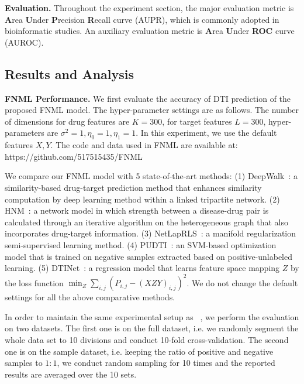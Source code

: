 \documentclass[conference]{IEEEtran}
\begin{document}

\textbf{Evaluation.} Throughout the experiment section, the major evaluation metric is \textbf{A}rea \textbf{U}nder \textbf{P}recision \textbf{R}ecall curve (AUPR), which is commonly adopted in bioinformatic studies. An auxiliary evaluation metric is \textbf{A}rea \textbf{U}nder \textbf{ROC} curve (AUROC).

\subsection{Results and Analysis}
\textbf{FNML Performance.} We first evaluate the accuracy of DTI prediction of the proposed FNML model. The hyper-parameter settings are as follows. The number of dimensions for drug features are $K=300$, for target features $L=300$, hyper-parameters are $\sigma^2=1,\eta_{0}=1,\eta_{1}=1$. In this experiment, we use the default features $X,Y$. The code and data used in FNML are available at: https://github.com/517515435/FNML



We compare our FNML model with 5 state-of-the-art methods: (1) DeepWalk~\cite{Zong2017Deep}: a similarity-based drug-target prediction method that enhances similarity computation by deep learning method within a linked tripartite network. (2) HNM~\cite{Wang2014Drug}: a network model in which strength between a disease-drug pair is calculated through an iterative algorithm on the heterogeneous graph that also incorporates drug-target information. (3) NetLapRLS~\cite{Xia2010Semi}: a manifold regularization semi-supervised learning method. (4) PUDTI~\cite{Peng2017Screening}: an SVM-based optimization model that is trained on negative samples extracted based on positive-unlabeled learning. (5) DTINet~\cite{Luo2017Network}: a regression model that learns feature space mapping $Z$ by the loss function  $\min_{Z} \sum_{i,j}(P_{i,j}-(XZY)_{i,j})^2$. We do not change the default settings for all the above comparative methods.

In order to maintain the same experimental setup as ~\cite{Luo2017Network}, we perform the evaluation on two datasets. The first one is on the full dataset, i.e. we randomly segment the whole data set to 10 divisions and conduct 10-fold cross-validation. The second one is on the sample dataset, i.e. keeping the ratio of positive and negative samples to $1:1$, we conduct random sampling for 10 times and the reported results are averaged over the 10 sets. 
\end{document}
